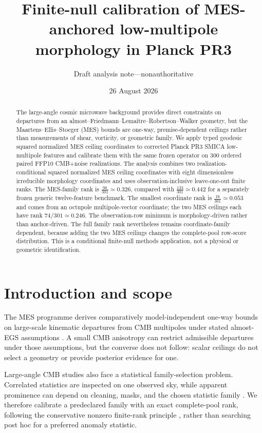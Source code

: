 \documentclass[11pt]{article}
\title{Finite-null calibration of MES-anchored low-multipole morphology in Planck PR3}
\author{Draft analysis note---nonauthoritative}
\date{26 August 2026}
\begin{document}
\maketitle

\begin{abstract}
The large-angle cosmic microwave background provides direct constraints on departures from an almost--Friedmann--Lema\^itre--Robertson--Walker geometry, but the Maartens--Ellis--Stoeger (MES) bounds are one-way, premise-dependent ceilings rather than measurements of shear, vorticity, or geometric family. We apply typed geodesic squared normalized MES ceiling coordinates to corrected Planck PR3 SMICA low-multipole features and calibrate them with the same frozen operator on 300 ordered paired FFP10 CMB+noise realizations. The analysis combines two realization-conditional squared normalized MES ceiling coordinates with eight dimensionless irreducible morphology coordinates and uses observation-inclusive leave-one-out finite ranks. The MES-family rank is $\frac{98}{301}\simeq 0.326$, compared with $\frac{133}{301}\simeq 0.442$ for a separately frozen generic twelve-feature benchmark. The smallest coordinate rank is $\frac{16}{301}\simeq 0.053$ and comes from an octupole multipole-vector coordinate; the two MES ceilings each have rank $74/301\simeq 0.246$. The observation-row minimum is morphology-driven rather than anchor-driven. The full family rank nevertheless remains coordinate-family dependent, because adding the two MES ceilings changes the complete-pool row-score distribution. This is a conditional finite-null methods application, not a physical or geometric identification.
\end{abstract}

\section{Introduction and scope}
The MES programme derives comparatively model-independent one-way bounds on large-scale kinematic departures from CMB multipoles under stated almost-EGS assumptions \cite{MaartensEllisStoeger1995,StoegerAraujoGebbie1997}. A small CMB anisotropy can restrict admissible departures under those assumptions, but the converse does not follow: scalar ceilings do not select a geometry or provide posterior evidence for one.

Large-angle CMB studies also face a statistical family-selection problem. Correlated statistics are inspected on one observed sky, while apparent prominence can depend on cleaning, masks, and the chosen statistic family \cite{Planck2018VII,HeroldEtAl2025}. We therefore calibrate a predeclared family with an exact complete-pool rank, following the conservative nonzero finite-rank principle \cite{PhipsonSmyth2010}, rather than searching post hoc for a preferred anomaly statistic.
\end{document}
